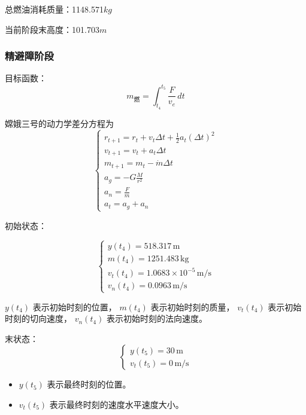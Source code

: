 \documentclass{ctexart}
\begin{document}
总燃油消耗质量：1148.571\(kg\)

当前阶段末高度：101.703\(m\)
\subsubsection{精避障阶段}

目标函数：
\begin{equation}
m_{\text{燃}} = \int_{t_4}^{t_5} \frac{F}{v_e} \, dt
\end{equation}

嫦娥三号的动力学差分方程为
\[
\begin{cases}
r_{t+1} = r_t + v_t \Delta t + \frac{1}{2} a_t (\Delta t)^2 \\
v_{t+1} = v_t + a_t \Delta t \\
m_{t+1} = m_t - \dot{m} \Delta t \\
a_g = - G \frac{M}{r^2} \\
a_n = \frac{F}{m} \\
a_t = a_g + a_n
\end{cases}
\]

初始状态：

\begin{equation}
\begin{cases}
y(t_4) = 518.317 \, \text{m} \\
m(t_4) = 1251.483 \, \text{kg} \\
v_t(t_4) = 1.0683\times 10^{-5} \, \text{m/s} \\
v_n(t_4) = 0.0963 \, \text{m/s}
\end{cases}
\end{equation}


$y(t_4)$ 表示初始时刻的位置，
$m(t_4)$ 表示初始时刻的质量，
$v_t(t_4)$ 表示初始时刻的切向速度，
$v_n(t_4)$ 表示初始时刻的法向速度。

末状态：
\begin{equation}
\begin{cases}
y(t_5) = 30 \, \text{m} \\
v_t(t_5) = 0 \, \text{m/s}
\end{cases}
\end{equation}

\begin{itemize}
\item $y(t_5)$ 表示最终时刻的位置。
\item $v_t(t_5)$ 表示最终时刻的速度水平速度大小。
\end{itemize}
\end{document}
